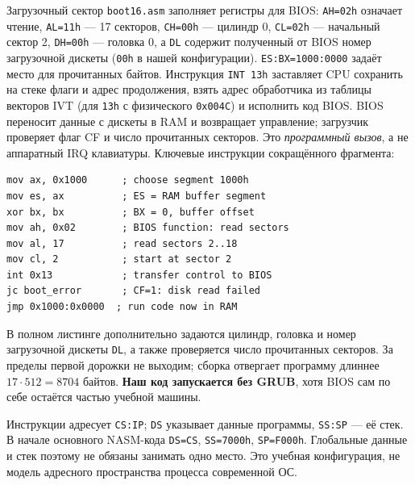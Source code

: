 Загрузочный сектор \texttt{boot16.asm} заполняет регистры для BIOS:
\texttt{AH=02h} означает чтение, \texttt{AL=11h} --- 17 секторов,
\texttt{CH=00h} --- цилиндр 0, \texttt{CL=02h} --- начальный сектор 2,
\texttt{DH=00h} --- головка 0, а \texttt{DL} содержит полученный от BIOS
номер загрузочной дискеты (\texttt{00h} в нашей конфигурации).
\texttt{ES:BX=1000:0000} задаёт место для прочитанных байтов.
Инструкция \texttt{INT 13h} заставляет CPU сохранить на стеке флаги
и адрес продолжения, взять адрес обработчика из таблицы векторов IVT
(для \texttt{13h} с физического \texttt{0x004C}) и исполнить код BIOS.
BIOS переносит данные с дискеты в RAM и возвращает управление;
загрузчик проверяет флаг CF и число прочитанных секторов. Это
\emph{программный вызов}, а не аппаратный IRQ клавиатуры.
Ключевые инструкции сокращённого фрагмента:
\begin{lstlisting}[basicstyle=\ttfamily\small]
mov ax, 0x1000      ; choose segment 1000h
mov es, ax          ; ES = RAM buffer segment
xor bx, bx          ; BX = 0, buffer offset
mov ah, 0x02        ; BIOS function: read sectors
mov al, 17          ; read sectors 2..18
mov cl, 2           ; start at sector 2
int 0x13            ; transfer control to BIOS
jc boot_error       ; CF=1: disk read failed
jmp 0x1000:0x0000  ; run code now in RAM
\end{lstlisting}
В полном листинге дополнительно задаются цилиндр, головка и номер
загрузочной дискеты \texttt{DL}, а также проверяется число прочитанных
секторов. За пределы первой дорожки не выходим; сборка отвергает программу
длиннее $17\cdot512=8704$ байтов. \textbf{Наш код запускается без GRUB},
хотя BIOS сам по себе остаётся частью учебной машины.

Инструкции адресует \texttt{CS:IP}; \texttt{DS} указывает данные программы,
\texttt{SS:SP} --- её стек. В начале основного NASM-кода \texttt{DS=CS},
\texttt{SS=7000h}, \texttt{SP=F000h}. Глобальные данные и стек поэтому
не обязаны занимать одно место. Это учебная конфигурация, не модель
адресного пространства процесса современной ОС.

